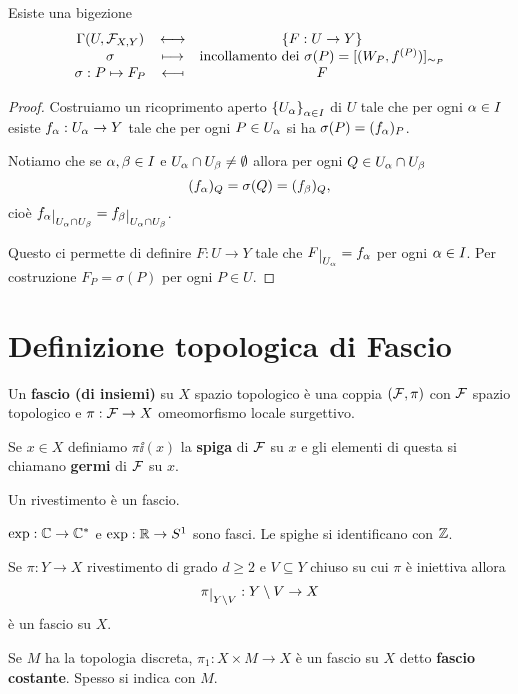 \begin{proposition}
Esiste una bigezione
\[\begin{array}{ccc} {\Gamma(U,\mathcal{F}_{X,Y})} & \longleftrightarrow & {\left\{{F:U\to Y}\right\}}\\ {\sigma} & \longmapsto & {\text{incollamento dei }\sigma(P)=[(W_P,f^{(P)})]_{\sim_P}}\\ {\sigma:P\mapsto F_P} & \longmapsfrom & {F} \end{array}\]
\end{proposition}
\begin{proof}
Costruiamo un ricoprimento aperto $\left\{{U_\alpha}\right\}_{\alpha\in I}$ di $U$ tale che per ogni $\alpha\in I$ esiste $f_\alpha:U_\alpha\to Y$ tale che per ogni $P\in U_\alpha$ si ha $\sigma(P)=(f_\alpha)_P$.

Notiamo che se $\alpha,\beta\in I$ e $U_\alpha\cap U_\beta\neq \emptyset$ allora per ogni $Q\in U_\alpha\cap U_\beta$
\[(f_\alpha)_Q=\sigma(Q)=(f_\beta)_Q,\]
cio\`e $f_\al\res{U_\al\cap U_\beta}=f_\beta\res{U_\al \cap U_\beta}$.

Questo ci permette di definire $F:U\to Y$ tale che $F\res{U_\al}=f_\al$ per ogni $\alpha\in I$. Per costruzione $F_P=\sigma(P)$ per ogni $P\in U$.
\end{proof}

\section{Definizione topologica di Fascio}
\begin{definition}[Fascio]
Un \textbf{fascio (di insiemi)} su $X$ spazio topologico \`e una coppia $(\mathcal{F},\pi)$ con $\mathcal{F}$ spazio topologico e $\pi:\mathcal{F}\to X$ omeomorfismo locale surgettivo.

Se $x\in X$ definiamo $\pi\ii(x)$ la \textbf{spiga} di $\mathcal{F}$ su $x$ e gli elementi di questa si chiamano \textbf{germi} di $\mathcal{F}$ su $x$.
\end{definition}

\begin{remark}
Un rivestimento \`e un fascio.
\end{remark}

\begin{example}
$\exp:\mathbb{C}\to \mathbb{C}^\ast$ e $\exp:\mathbb{R}\to S^1$ sono fasci. Le spighe si identificano con $\mathbb{Z}$.
\end{example}

\begin{example}
Se $\pi:Y\to X$ rivestimento di grado $d\geq 2$ e $V\subseteq Y$ chiuso su cui $\pi$ \`e iniettiva allora
\[\pi\res{Y\bs V}:Y\bs V\to X\]
\`e un fascio su $X$.
\end{example}

\begin{definition}
Se $M$ ha la topologia discreta, $\pi_1:X\times M\to X$ \`e un fascio su $X$ detto \textbf{fascio costante}. Spesso si indica con $M$.
\end{definition}


